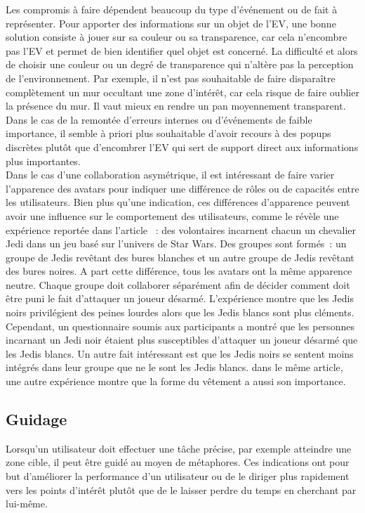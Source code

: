 \documentclass[11pt]{article}
\begin{document}
Les compromis à faire dépendent beaucoup du type d'événement ou de fait à représenter. Pour apporter des informations sur un objet de l'EV, une bonne solution consiste à jouer sur sa couleur ou sa transparence, car cela n'encombre pas l'EV et permet de bien identifier quel objet est concerné. La difficulté et alors de choisir une couleur ou un degré de transparence qui n'altère pas la perception de l'environnement. Par exemple, il n'est pas souhaitable de faire disparaître complètement un mur occultant une zone d'intérêt, car cela risque de faire oublier la présence du mur. Il vaut mieux en rendre un pan moyennement transparent. Dans le cas de la remontée d'erreurs internes ou d'événements de faible importance, il semble à priori plus souhaitable d'avoir recours à des popups discrètes plutôt que d'encombrer l'EV qui sert de support direct aux informations plus importantes.
\\

Dans le cas d'une collaboration asymétrique, il est intéressant de faire varier l'apparence des avatars pour indiquer une différence de rôles ou de capacités entre les utilisateurs. Bien plus qu'une indication, ces différences d'apparence peuvent avoir une influence sur le comportement des utilisateurs, comme le révèle une expérience reportée dans l'article \cite{jedi}~: des volontaires incarnent chacun un chevalier Jedi dans un jeu basé sur l'univers de Star Wars. Des groupes sont formés~: un groupe de Jedis revêtant des bures blanches et un autre groupe de Jedis revêtant des bures noires. A part cette différence, tous les avatars ont la même apparence neutre. Chaque groupe doit collaborer séparément afin de décider comment doit être puni le fait d'attaquer un joueur désarmé. L'expérience montre que les Jedis noirs privilégient des peines lourdes alors que les Jedis blancs sont plus cléments. Cependant, un questionnaire soumis aux participants a montré que les personnes incarnant un Jedi noir étaient plus susceptibles d'attaquer un joueur désarmé que les Jedis blancs. Un autre fait intéressant est que les Jedis noirs se sentent moins intégrés dans leur groupe que ne le sont les Jedis blancs. dans le même article, une autre expérience montre que la forme du vêtement a aussi son importance.

\subsection{Guidage}
\label{subsec:facilitation}
Lorsqu'un utilisateur doit effectuer une tâche précise, par exemple atteindre une zone cible, il peut être guidé au moyen de métaphores. Ces indications ont pour but d'améliorer la performance d'un utilisateur ou de le diriger plus rapidement vers les points d'intérêt plutôt que de le laisser perdre du temps en cherchant par lui-même.
\\
\end{document}
